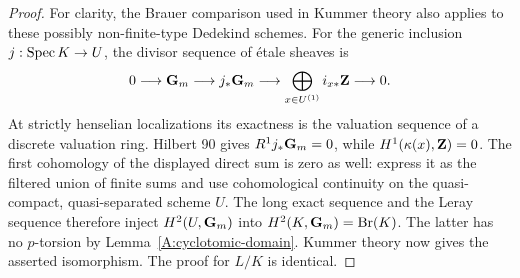 \begin{proof}
For clarity, the Brauer comparison used in Kummer theory also applies
to these possibly non-finite-type Dedekind schemes. For the generic
inclusion $j:\operatorname{Spec} K\to U$, the divisor sequence of étale sheaves is
\[
 0\longrightarrow\mathbf G_m\longrightarrow j_*\mathbf G_m
   \longrightarrow\bigoplus_{x\in U^{(1)}}i_{x*}\mathbf Z\longrightarrow0.
\]
At strictly henselian localizations its exactness is the valuation
sequence of a discrete valuation ring. Hilbert 90 gives
$R^1j_*\mathbf G_m=0$, while $H^1(\kappa(x),\mathbf Z)=0$. The first cohomology of the displayed direct sum is zero as well: express it as the filtered union of finite sums and use cohomological continuity on the quasi-compact, quasi-separated scheme $U$. The long exact sequence
and the Leray sequence therefore inject
$H^2(U,\mathbf G_m)$ into $H^2(K,\mathbf G_m)=\operatorname{Br}(K)$.
The latter has no $p$-torsion by Lemma~\ref{A:cyclotomic-domain}.
Kummer theory now gives the asserted isomorphism. The proof for
$L/K$ is identical.
\end{proof}

